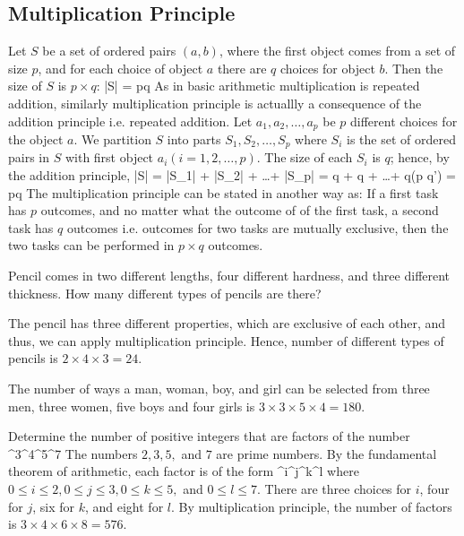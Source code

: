 \subsection{Multiplication Principle}
Let $S$ be a set of ordered pairs $(a, b)$, where the first object comes from a set of size $p$, and for each choice of object $a$
there are $q$ choices for object $b$. Then the size of $S$ is $p\times q$:
\startformula |S| = p\times q\stopformula
As in basic arithmetic multiplication is repeated addition, similarly multiplication principle is actuallly a consequence of the
addition principle i.e. repeated addition. Let $a_1, a_2, \ldots, a_p$ be $p$ different choices for the object $a$. We partition
$S$ into parts $S_1, S_2, \ldots, S_p$ where $S_i$ is the set of ordered pairs in $S$ with first object $a_i(i = 1, 2, \ldots,
p)$. The size of each $S_i$ is $q$; hence, by the addition principle,
\startformula |S| = |S_1| + |S_2| + \ldots + |S_p|\stopformula
\startformula = q + q + \ldots + q(p q')\stopformula
\startformula = p\times q\stopformula
The multiplication principle can be stated in another way as: If a first task has $p$ outcomes, and no matter what the outcome of of
the first task, a second task has $q$ outcomes i.e. outcomes for two tasks are mutually exclusive, then the two tasks can be
performed in $p\times q$ outcomes.

 Pencil comes in two different lengths, four different hardness, and three different thickness. How many
different types of pencils are there?

The pencil has three different properties, which are exclusive of each other, and thus, we can apply multiplication
principle. Hence, number of different types of pencils is $2\times4\times3 = 24$.

 The number of ways a man, woman, boy, and girl can be selected from three men, three women, five boys and
four girls is $3\times3\times5\times4 = 180$.

 Determine the number of positive integers that are factors of the number
^3^4^5^7\stopformula
The numbers $2, 3, 5,$ and $7$ are prime numbers. By the fundamental theorem of arithmetic, each factor is of the form
^i^j^k^l\stopformula
where $0\leq i\leq2, 0\leq j\leq3, 0\leq k\leq5,$ and $0\leq l\leq7$. There are three choices for $i$, four for $j$, six for $k$, and
eight for $l$. By multiplication principle, the number of factors is $3\times4\times6\times8 = 576$.

